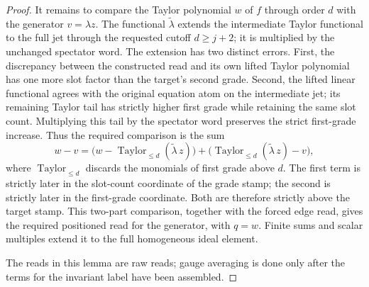 \begin{proof}
It remains to compare the Taylor polynomial $w$ of $f$ through order $d$
with the generator $v=\lambda z$. The functional $\widetilde\lambda$
extends the intermediate Taylor functional to the full jet through the
requested cutoff $d\geq j+2$; it is multiplied by the unchanged spectator
word.
The extension has two distinct errors. First, the discrepancy between
the constructed read and its own lifted Taylor polynomial has one more
slot factor than the target's second grade. Second, the lifted
linear functional agrees with the original equation atom on the
intermediate jet; its remaining Taylor tail has strictly higher first
grade while retaining the same slot count. Multiplying this tail by the
spectator word preserves the strict first-grade increase. Thus the
required comparison is the sum
\[
 w-v=\bigl(w-\operatorname{Taylor}_{\leq d}(\widetilde\lambda\,z)\bigr)
       +\bigl(\operatorname{Taylor}_{\leq d}(\widetilde\lambda\,z)-v\bigr),
\]
where $\operatorname{Taylor}_{\leq d}$ discards the monomials of first
grade above $d$.
The first term is strictly later in the slot-count coordinate of the
grade stamp; the second is strictly later in the first-grade coordinate.
Both are therefore strictly above the target stamp. This two-part
comparison, together with the forced edge read, gives the required
positioned read for the generator, with $q=w$. Finite sums and scalar
multiples extend it to the full homogeneous ideal element.

The reads in this lemma are raw reads; gauge averaging is done only after
the terms for the invariant label have been assembled.
\end{proof}

